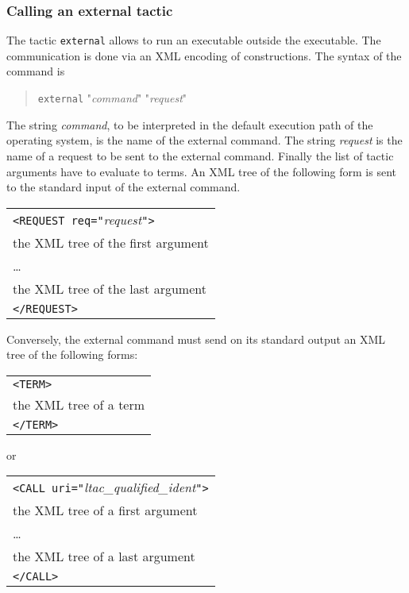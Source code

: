 \ErrMsg {}

\subsubsection{Calling an external tactic}

The tactic {\tt external} allows to run an executable outside the
{\Coq} executable. The communication is done via an XML encoding of
constructions. The syntax of the command is

\begin{quote}
{\tt external} "\textsl{command}" "\textsl{request}" \nelist{\tacarg}{}
\end{quote}

The string \textsl{command}, to be interpreted in the default
execution path of the operating system, is the name of the external
command. The string \textsl{request} is the name of a request to be
sent to the external command. Finally the list of tactic arguments
have to evaluate to terms. An XML tree of the following form is sent
to the standard input of the external command.
\medskip

\begin{tabular}{l}
\texttt{<REQUEST req="}\textsl{request}\texttt{">}\\
the XML tree of the first argument\\
{\ldots}\\
the XML tree of the last argument\\
\texttt{</REQUEST>}\\
\end{tabular}
\medskip

Conversely, the external command must send on its standard output an
XML tree of the following forms:

\medskip
\begin{tabular}{l}
\texttt{<TERM>}\\
the XML tree of a term\\
\texttt{</TERM>}\\
\end{tabular}
\medskip

\noindent or 

\medskip
\begin{tabular}{l}
\texttt{<CALL uri="}\textsl{ltac\_qualified\_ident}\texttt{">}\\
the XML tree of a first argument\\
{\ldots}\\
the XML tree of a last argument\\
\texttt{</CALL>}\\
\end{tabular}

